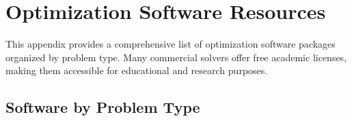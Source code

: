 
\chapter{Optimization Software Resources}
\label{app:software}

This appendix provides a comprehensive list of optimization software packages organized by problem type. Many commercial solvers offer free academic licenses, making them accessible for educational and research purposes.

\section{Software by Problem Type}

